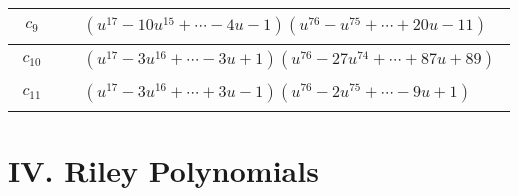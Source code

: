\documentclass[1p]{elsarticle_modified}
\theoremstyle{definition}
\begin{document}
\begin{tabular}{m{50pt}|m{274pt}}
\hline $$\begin{aligned}c_{9}\end{aligned}$$&$\begin{aligned}
&(u^{17}-10 u^{15}+\cdots-4 u-1)(u^{76}- u^{75}+\cdots+20 u-11)
\end{aligned}$\\
\hline $$\begin{aligned}c_{10}\end{aligned}$$&$\begin{aligned}
&(u^{17}-3 u^{16}+\cdots-3 u+1)(u^{76}-27 u^{74}+\cdots+87 u+89)
\end{aligned}$\\
\hline $$\begin{aligned}c_{11}\end{aligned}$$&$\begin{aligned}
&(u^{17}-3 u^{16}+\cdots+3 u-1)(u^{76}-2 u^{75}+\cdots-9 u+1)
\end{aligned}$\\
\hline
\end{tabular}\newpage\renewcommand{\arraystretch}{1}
\centering \section*{ IV. Riley Polynomials}
\end{document}
